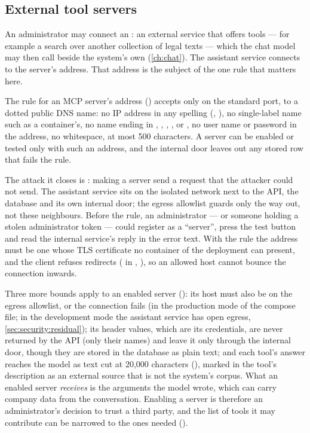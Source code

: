 \subsection{External tool servers}\label{sec:security:ai:mcp}

An administrator may connect an : an external service that offers tools ---
for example a search over another collection of legal texts --- which the chat model may then
call beside the system's own (\cref{ch:chat}). The assistant service connects to the server's
address. That address is the subject of the one rule that matters here.

\begin{codebox}{The rule for an MCP server's address}
 () accepts only  on the
standard port, to a dotted public DNS name: no IP address in any spelling (,
), no single-label name such as a container's, no name ending in
, , , ,  or
, no user name or password in the address, no whitespace, at most 500
characters. A server can be enabled or tested only with such an address, and the internal
door leaves out any stored row that fails the rule.
\end{codebox}

The attack it closes is : making a server send a request
that the attacker could not send. The assistant service sits on the isolated network next to
the API, the database and its own internal door; the egress allowlist guards only the way
out, not these neighbours. Before the rule, an administrator --- or someone holding a stolen
administrator token --- could register  as a
\enquote{server}, press the test button and read the internal service's reply in the error
text. With the rule the address must be one whose TLS certificate no container of the
deployment can present, and the client refuses redirects (  in
, ), so an allowed host cannot bounce the connection inwards.

Three more bounds apply to an enabled server (): its host must also be on
the egress allowlist, or the connection fails (in the production mode of the compose file;
in the development mode the assistant service has open egress,
\cref{sec:security:residual}); its header values, which are its credentials,
are never returned by the API (only their names) and leave it only through the internal
door, though they are stored in the database as plain text; and each tool's answer reaches the model as text cut at 20,000 characters
(), marked in the tool's description as an external source that is not the
system's corpus. What an enabled server \emph{receives} is the arguments the model wrote,
which can carry company data from the conversation. Enabling a server is therefore an
administrator's decision to trust a third party, and the list of tools it may contribute
can be narrowed to the ones needed ().


